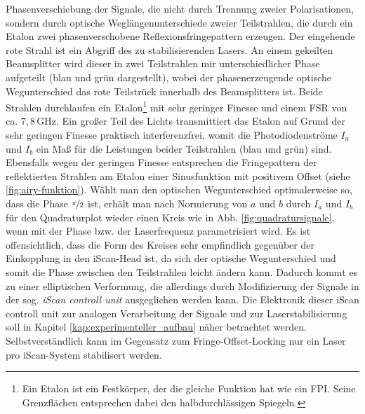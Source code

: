 Phasenverschiebung der Signale, die nicht durch Trennung zweier Polarisationen,
sondern durch optische Weglängenunterschiede zweier Teilstrahlen, die durch ein
Etalon zwei phasenverschobene Reflexionsfringepattern erzeugen. Der eingehende
rote Strahl ist ein Abgriff des zu stabilisierenden Lasers. An einem gekeilten
Beamsplitter wird dieser in zwei Teilstrahlen mir unterschiedlicher Phase
aufgeteilt (blau und grün dargestellt), wobei der phasenerzeugende optische
Wegunterschied das rote Teilstrück innerhalb des Beamsplitters ist. Beide
Strahlen durchlaufen ein Etalon\footnote{Ein Etalon ist ein Festkörper, der die gleiche Funktion hat wie ein FPI. Seine Grenzflächen entsprechen dabei den halbdurchlässigen Spiegeln.} mit sehr geringer Finesse und einem FSR von ca. $7,8\,$GHz. Ein großer Teil des Lichts transmittiert das Etalon auf Grund der sehr geringen Finesse praktisch
interferenzfrei, womit die Photodiodenströme $I_a$ und $I_b$ ein Maß für die Leistungen beider Teilstrahlen
(blau und grün) sind. Ebensfalls wegen der geringen Finesse entsprechen die
Fringepattern der reflektierten Strahlen am Etalon einer Sinusfunktion mit positivem Offset
(siehe \ref{fig:airy-funktion}). Wählt man den optischen Wegunterschied
optimalerweise so, dass die Phase $\nicefrac{\pi}{2}$ ist, erhält
man nach Normierung von $a$ und $b$ durch $I_a$ und $I_b$ für den Quadraturplot
wieder einen Kreis wie in Abb. \ref{fig:quadratursignale}, wenn mit der Phase bzw. der Laserfrequenz parametrisiert wird. Es ist offensichtlich, dass die Form des Kreises sehr
empfindlich gegenüber der Einkopplung in den iScan-Head ist, da sich der
optische Wegunterschied und somit die Phase zwischen den Teilstrahlen leicht
ändern kann. Dadurch kommt es zu einer elliptischen Verformung, die allerdings durch
Modifizierung der Signale in der sog. \textit{iScan controll unit} ausgeglichen
werden kann. Die Elektronik dieser iScan controll unit zur analogen
Verarbeitung der Signale und zur Laserstabilisierung soll in Kapitel
\ref{kap:experimenteller_aufbau} näher betrachtet werden. Selbstverständlich
kann im Gegensatz zum Fringe-Offset-Locking nur ein Laser pro iScan-System
stabilisert werden.


